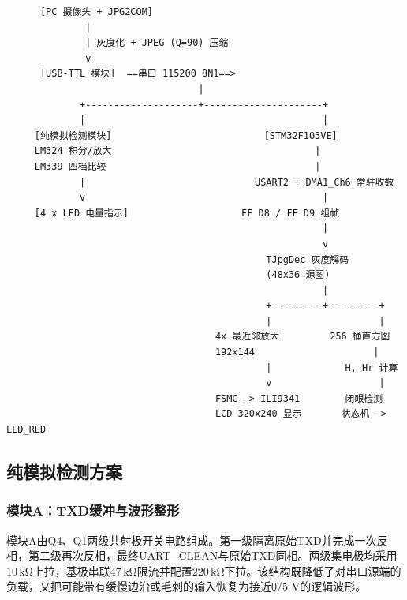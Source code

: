 \documentclass[a4paper]{article}
\newcommand{\unit}[1]{\ensuremath{\,\mathrm{#1}}}
\begin{document}
\begin{center}
\begin{minipage}{0.9\textwidth}
\begin{verbatim}
      [PC 摄像头 + JPG2COM]
              |
              | 灰度化 + JPEG (Q=90) 压缩
              v
      [USB-TTL 模块]  ==串口 115200 8N1==>
                                  |
             +--------------------+---------------------+
             |                                          |
     [纯模拟检测模块]                           [STM32F103VE]
     LM324 积分/放大                                    |
     LM339 四档比较                                     |
             |                              USART2 + DMA1_Ch6 常驻收数
             v                                          |
     [4 x LED 电量指示]                    FF D8 / FF D9 组帧
                                                        |
                                                        v
                                              TJpgDec 灰度解码
                                              (48x36 源图)
                                                        |
                                              +---------+---------+
                                              |                   |
                                     4x 最近邻放大         256 桶直方图
                                     192x144                     |
                                              |             H, Hr 计算
                                              v                   |
                                     FSMC -> ILI9341        闭眼检测
                                     LCD 320x240 显示       状态机 -> LED_RED
\end{verbatim}
\end{minipage}
\end{center}



\subsection{纯模拟检测方案}

\subsubsection{模块A：TXD缓冲与波形整形}
模块A由Q4、Q1两级共射极开关电路组成。第一级隔离原始TXD并完成一次反相，第二级再次反相，最终UART\_CLEAN与原始TXD同相。两级集电极均采用$10\unit{k\Omega}$上拉，基极串联$47\unit{k\Omega}$限流并配置$220\unit{k\Omega}$下拉。该结构既降低了对串口源端的负载，又把可能带有缓慢边沿或毛刺的输入恢复为接近0/5 V的逻辑波形。
\end{document}
